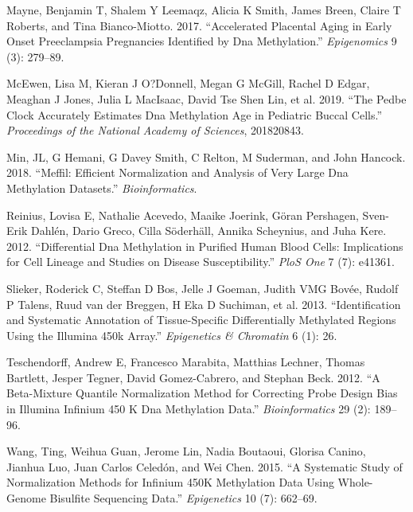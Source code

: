 \documentclass[]{article}
\begin{document}
\leavevmode\hypertarget{ref-mayne2017accelerated}{}%
Mayne, Benjamin T, Shalem Y Leemaqz, Alicia K Smith, James Breen, Claire T Roberts, and Tina Bianco-Miotto. 2017. ``Accelerated Placental Aging in Early Onset Preeclampsia Pregnancies Identified by Dna Methylation.'' \emph{Epigenomics} 9 (3): 279--89.

\leavevmode\hypertarget{ref-mcewen2019pedbe}{}%
McEwen, Lisa M, Kieran J O?Donnell, Megan G McGill, Rachel D Edgar, Meaghan J Jones, Julia L MacIsaac, David Tse Shen Lin, et al. 2019. ``The Pedbe Clock Accurately Estimates Dna Methylation Age in Pediatric Buccal Cells.'' \emph{Proceedings of the National Academy of Sciences}, 201820843.

\leavevmode\hypertarget{ref-min2018meffil}{}%
Min, JL, G Hemani, G Davey Smith, C Relton, M Suderman, and John Hancock. 2018. ``Meffil: Efficient Normalization and Analysis of Very Large Dna Methylation Datasets.'' \emph{Bioinformatics}.

\leavevmode\hypertarget{ref-reinius2012differential}{}%
Reinius, Lovisa E, Nathalie Acevedo, Maaike Joerink, Göran Pershagen, Sven-Erik Dahlén, Dario Greco, Cilla Söderhäll, Annika Scheynius, and Juha Kere. 2012. ``Differential Dna Methylation in Purified Human Blood Cells: Implications for Cell Lineage and Studies on Disease Susceptibility.'' \emph{PloS One} 7 (7): e41361.

\leavevmode\hypertarget{ref-slieker2013identification}{}%
Slieker, Roderick C, Steffan D Bos, Jelle J Goeman, Judith VMG Bovée, Rudolf P Talens, Ruud van der Breggen, H Eka D Suchiman, et al. 2013. ``Identification and Systematic Annotation of Tissue-Specific Differentially Methylated Regions Using the Illumina 450k Array.'' \emph{Epigenetics \& Chromatin} 6 (1): 26.

\leavevmode\hypertarget{ref-teschendorff2012beta}{}%
Teschendorff, Andrew E, Francesco Marabita, Matthias Lechner, Thomas Bartlett, Jesper Tegner, David Gomez-Cabrero, and Stephan Beck. 2012. ``A Beta-Mixture Quantile Normalization Method for Correcting Probe Design Bias in Illumina Infinium 450 K Dna Methylation Data.'' \emph{Bioinformatics} 29 (2): 189--96.

\leavevmode\hypertarget{ref-wang2015systematic}{}%
Wang, Ting, Weihua Guan, Jerome Lin, Nadia Boutaoui, Glorisa Canino, Jianhua Luo, Juan Carlos Celedón, and Wei Chen. 2015. ``A Systematic Study of Normalization Methods for Infinium 450K Methylation Data Using Whole-Genome Bisulfite Sequencing Data.'' \emph{Epigenetics} 10 (7): 662--69.
\end{document}
